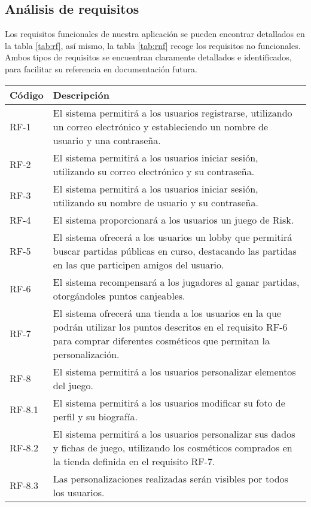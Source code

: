 \documentclass[11pt, a4paper, titlepage]{article}
\begin{document}
\subsection{Análisis de requisitos}
Los requisitos funcionales de nuestra aplicación se pueden encontrar detallados en la tabla \ref{tab:rf}, así mismo, la tabla \ref{tab:rnf} recoge los requisitos no funcionales. Ambos tipos de requisitos se encuentran claramente detallados e identificados, para facilitar su referencia en documentación futura.
\renewcommand{\arraystretch}{1.3}
\begin{table}[h!]
    \centering
    \begin{tabularx}{\textwidth}{|l|X|}
    \hline
         Código & Descripción  \\
         \hline
         RF-1 & El sistema permitirá a los usuarios registrarse, utilizando un correo electrónico y estableciendo un nombre de usuario y una contraseña.\\
         RF-2 & El sistema permitirá a los usuarios iniciar sesión, utilizando su correo electrónico y su contraseña.\\
         RF-3 & El sistema permitirá a los usuarios iniciar sesión, utilizando su nombre de usuario y su contraseña.\\
         RF-4 & El sistema proporcionará a los usuarios un juego de Risk.\\
         RF-5 & El sistema ofrecerá a los usuarios un lobby que permitirá buscar partidas públicas en curso, destacando las partidas en las que participen amigos del usuario.\\
         RF-6 & El sistema recompensará a los jugadores al ganar partidas, otorgándoles puntos canjeables.\\
         RF-7 & El sistema ofrecerá una tienda a los usuarios en la que podrán utilizar los puntos descritos en el requisito RF-6 para comprar diferentes cosméticos que permitan la personalización. \\
         RF-8 & El sistema permitirá a los usuarios personalizar elementos del juego.\\
         RF-8.1 & El sistema permitirá a los usuarios modificar su foto de perfil y su biografía.\\
         RF-8.2 & El sistema permitirá a los usuarios personalizar sus dados y fichas de juego, utilizando los cosméticos comprados en la tienda definida en el requisito RF-7.\\
         RF-8.3 & Las personalizaciones realizadas serán visibles por todos los usuarios.\\

\end{tabularx}
\end{table}
\end{document}
